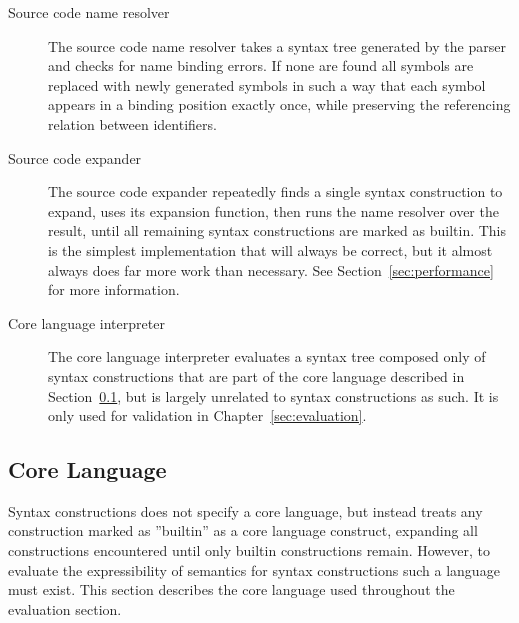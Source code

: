 \documentclass{kththesis}
\begin{document}
\begin{description}
  \item[Source code name resolver] The source code name resolver takes a syntax tree generated by the parser and checks for name binding errors. If none are found all symbols are replaced with newly generated symbols in such a way that each symbol appears in a binding position exactly once, while preserving the referencing relation between identifiers.

  \item[Source code expander] The source code expander repeatedly finds a single syntax construction to expand, uses its expansion function, then runs the name resolver over the result, until all remaining syntax constructions are marked as builtin. This is the simplest implementation that will always be correct, but it almost always does far more work than necessary. See Section~\ref{sec:performance} for more information.

  \item[Core language interpreter] The core language interpreter evaluates a syntax tree composed only of syntax constructions that are part of the core language described in Section~\ref{sec:core-language}, but is largely unrelated to syntax constructions as such. It is only used for validation in Chapter~\ref{sec:evaluation}.
\end{description}

\subsection{Core Language} \label{sec:core-language}

Syntax constructions does not specify a core language, but instead treats any construction marked as ''builtin'' as a core language construct, expanding all constructions encountered until only builtin constructions remain. However, to evaluate the expressibility of semantics for syntax constructions such a language must exist. This section describes the core language used throughout the evaluation section.
\end{document}
